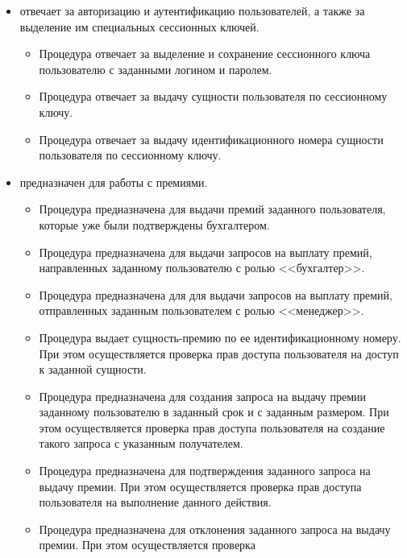 \begin{itemize}
    \item {} отвечает за авторизацию и аутентификацию пользователей, а также за выделение им специальных сессионных ключей.
    \begin{itemize}
        \item Процедура  отвечает за выделение и сохранение сессионного ключа пользователю с заданными логином и паролем.
        \item Процедура  отвечает за выдачу сущности пользователя по сессионному ключу.
        \item Процедура  отвечает за выдачу идентификационного номера сущности пользователя по сессионному ключу.
    \end{itemize}
    \item {} предназначен для работы с премиями.
    \begin{itemize}
        \item Процедура  предназначена для выдачи премий заданного пользователя, которые уже были подтверждены 
            бухгалтером. 
        \item Процедура  предназначена для выдачи запросов на выплату премий, направленных заданному пользователю с
            ролью <<бухгалтер>>.
        \item Процедура  предназначена для для выдачи запросов на выплату премий, отправленных заданным 
            пользователем с ролью <<менеджер>>. 
        \item Процедура  выдает сущность-премию по ее идентификационному номеру. При этом осуществляется проверка прав доступа
            пользователя  на доступ к заданной сущности.
        \item Процедура  предназначена для создания запроса на выдачу премии заданному пользователю в заданный срок и с 
            заданным размером. При этом осуществляется проверка прав доступа пользователя  на создание такого запроса с 
            указанным получателем.
        \item Процедура  предназначена для подтверждения заданного запроса на выдачу премии. При этом осуществляется проверка 
            прав доступа пользователя  на выполнение данного действия.
        \item Процедура  предназначена для отклонения заданного запроса на выдачу премии. При этом осуществляется проверка 

\end{itemize}
\end{itemize}
